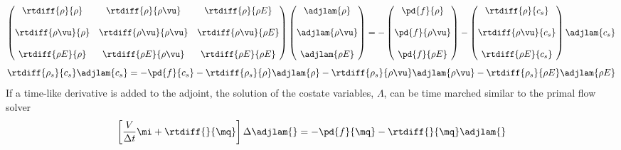 \begin{equation}
  \begin{pmatrix}
    \rtdiff{\rho}{\rho} & \rtdiff{\rho}{\rho \vu} & \rtdiff{\rho}{\rho E} \\ \\
    \rtdiff{\rho \vu}{\rho} & \rtdiff{\rho \vu}{\rho \vu} & \rtdiff{\rho \vu}{\rho E} \\ \\
    \rtdiff{\rho E}{\rho} & \rtdiff{\rho E}{\rho \vu} & \rtdiff{\rho E}{\rho E}
  \end{pmatrix}
  \begin{pmatrix}
    \adjlam{\rho} \\ \\
    \adjlam{\rho \vu} \\ \\
    \adjlam{\rho E}
  \end{pmatrix}
  = -
  \begin{pmatrix}
    \pd{f}{\rho} \\ \\
    \pd{f}{\rho \vu} \\ \\
    \pd{f}{\rho E}
  \end{pmatrix}
  -
  \begin{pmatrix}
    \rtdiff{\rho}{c_s} \\ \\
    \rtdiff{\rho \vu}{c_s} \\ \\
    \rtdiff{\rho E}{c_s}
  \end{pmatrix}
  \adjlam{c_s}
  \label{dc-adjoint-1}
\end{equation}
\begin{equation}
  \rtdiff{\rho_s}{c_s}
  \adjlam{c_s}
  = -\pd{f}{c_s}
  - \rtdiff{\rho_s}{\rho} \adjlam{\rho}
  - \rtdiff{\rho_s}{\rho \vu} \adjlam{\rho \vu}
  - \rtdiff{\rho_s}{\rho E} \adjlam{\rho E}
  \label{dc-adjoint-2}
\end{equation}
If a time-like derivative is added to the adjoint, the solution of the costate
variables, $\Lambda$, can be time marched similar to the primal flow solver
\begin{equation}
  \left[ \frac{V}{\Delta t} \mi + \rtdiff{}{\mq} \right] \Delta
  \adjlam{}
  = -\pd{f}{\mq} - \rtdiff{}{\mq} \adjlam{}
  \label{adj-dc-time-general}
\end{equation}
